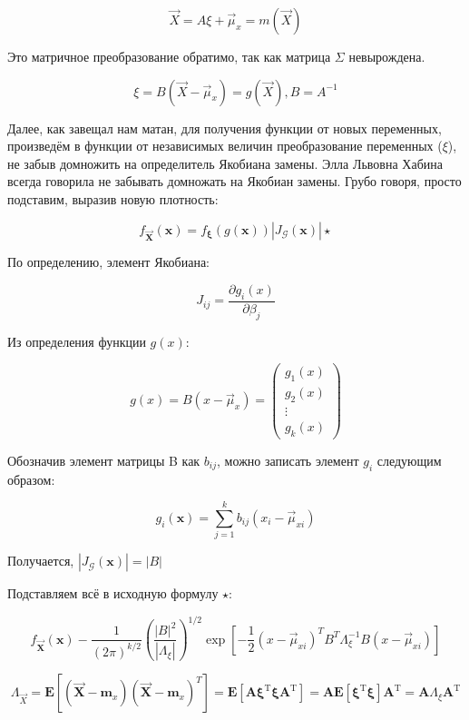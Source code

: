 \documentclass[a4paper,12pt]{article}
\begin{document}
\[ \vec{X} = A \xi + \vec{\mu}_x = m(\vec{X})\]

Это матричное преобразование обратимо, так как матрица $ \Sigma $ невырождена.

\[ \xi = B(\vec{X} -  \vec{\mu}_x) = g(\vec{X}), B = A^{-1}\]

Далее, как завещал нам матан, для получения функции от новых переменных, произведём в функции от независимых величин преобразование переменных ($ \xi $), не забыв домножить на определитель Якобиана замены.  Элла Львовна Хабина всегда говорила не забывать домножать на Якобиан замены. Грубо говоря, просто подставим, выразив новую плотность:

\[ f_{\mathbf{\vec{X}}}(\boldsymbol{x})=f_{\mathbf{\xi}}(g(\boldsymbol{x}))\left|J_{\mathscr{G}}(\boldsymbol{x})\right|  \star \]

По определению, элемент Якобиана:

\[
J_{i j}=\frac{\partial g_{i}(x)}{\partial \beta_{j}}
\]

Из определения функции $ g(x) $:

\[  g(x) =  B(x -  \vec{\mu}_x)  = \begin{pmatrix}
g_1(x)\\
g_2(x)\\
\vdots \\
g_k(x)
\end{pmatrix}\]

Обозначив элемент матрицы B как $ b_{ij} $, можно записать элемент $ g_i $ следующим образом:



\[
g_{i}(\boldsymbol{x})=\sum_{j=1}^{k} b_{i j}\left(x_i-\vec{\mu}_{xi}\right)
\]

Получается, $ \left|J_{\mathscr{G}}(\boldsymbol{x})\right| = |B| $


Подставляем всё в исходную формулу $ \star $:

\[
f_{\mathbf{\vec{X}}}(\boldsymbol{x})-\frac{1}{(2 \pi)^{k / 2}}\left(\frac{|B|^{2}}{\left|\Lambda_{\xi}\right|}\right)^{1 / 2} \exp \left[-\frac{1}{2}\left(x-\vec{\mu}_{xi}\right)^T B^T \Lambda_{\xi}^{-1} B\left(x-\vec{\mu}_{xi} \right)\right]
\]

\[
\Lambda_{\vec{X}} = \mathbf{E}\left[\left(\mathbf{\vec{X}}-\mathbf{m}_{x} \right)\left(\mathbf{\vec{X}}-\mathbf{m}_{x}\right) ^ T\right]=\mathbf{E}\left[\mathbf{A} \mathbf{\xi}^{\mathrm{T}} \mathbf{\xi} \mathbf{A}^{\mathrm{T}}\right]= \mathbf{A} \mathbf{E}\left[\mathbf{\xi}^{\mathrm{T}} \mathbf{\xi} \right] \mathbf{A}^{\mathrm{T}}=\mathbf{A} \Lambda_{\xi} \mathbf{A}^{\mathrm{T}}
\]
\end{document}
